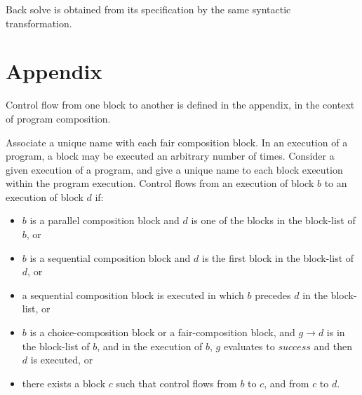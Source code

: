 Back solve is obtained from its specification by the
same syntactic transformation.

\section*{Appendix}
Control flow from one block to another is defined in the appendix,
in the context of program composition.

Associate a unique name with each fair composition block.
In an execution of a program, a block may be executed an arbitrary number
of times.
Consider a given execution of a program, and give a unique name to each
block execution within the program execution.
Control flows from an execution of block $b$ to an execution of block $d$ if:
\begin{itemize}
   \item $b$ is a parallel composition block and $d$ is one of the blocks in
      the block-list of $b$, or
   \item $b$ is a sequential composition block and $d$ is the first block in
   the block-list of $d$, or
   \item a sequential composition block is executed in which $b$ precedes $d$
   in the block-list, or
   \item $b$ is a choice-composition block or a fair-composition block, and
   $g \rightarrow d$ is in the block-list of $b$, and
   in the execution of $b$, $g$ evaluates to $success$ and then
   $d$ is executed, or
   \item there exists a block $c$ such that control flows from $b$ to $c$, and
   from $c$ to $d$.
\end{itemize}




      

